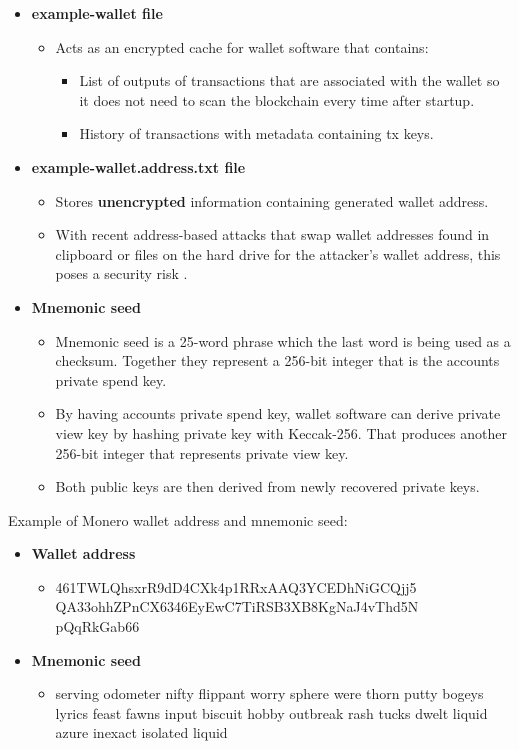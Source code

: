 \documentclass[
  printed, %
  table,   %
  nolof,     %
  nolot,     %
           oneside, color
]{fithesis3}
\renewcommand{\texttt}[1]{%
  \begingroup
  \ttfamily
  \begingroup\lccode`~=`/\lowercase{\endgroup\def~}{/\discretionary{}{}{}}%
  \begingroup\lccode`~=`[\lowercase{\endgroup\def~}{[\discretionary{}{}{}}%
  \begingroup\lccode`~=`.\lowercase{\endgroup\def~}{.\discretionary{}{}{}}%
  \catcode`/=\active\catcode`[=\active\catcode`.=\active
  \scantokens{#1\noexpand}%
  \endgroup
}
\begin{document}
\begin{itemize}
\item \textbf{example-wallet file}
\begin{itemize}\itemsep0em
\item Acts as an encrypted cache for wallet software that contains:
\begin{itemize}\itemsep0em
\item List of outputs of transactions that are associated with the wallet so it does not need to scan the blockchain every time after startup.
\item History of transactions with metadata containing tx keys.
\end{itemize}
\end{itemize}
\item \textbf{example-wallet.address.txt file}
\begin{itemize}\itemsep0em
\item Stores \textbf{unencrypted} information containing generated wallet address.
\item With recent address-based attacks that swap wallet addresses found in clipboard or files on the hard drive for the attacker's wallet address, this poses a security risk \cite{cryptoshuffler}.
\end{itemize}
\item \textbf{Mnemonic seed}
\begin{itemize}\itemsep0em
\item Mnemonic seed is a 25-word phrase which the last word is being used as a checksum. Together they represent a 256-bit integer that is the accounts private spend key.
\item By having accounts private spend key, wallet software can derive private view key by hashing private key with Keccak-256. That produces another 256-bit integer that represents private view key.
\item Both public keys are then derived from newly recovered private keys.
\end{itemize}
\end{itemize}
Example of Monero wallet address and mnemonic seed:
\begin{itemize}\itemsep0em
\item \textbf{Wallet address}
\begin{itemize}\itemsep0em
\item 461TWLQhsxrR9dD4CXk4p1RRxAAQ3YCEDhNiGCQjj5\\QA33ohhZPnCX6346EyEwC7TiRSB3XB8KgNaJ4vThd5N\\pQqRkGab66
\end{itemize}
\item \textbf{Mnemonic seed}
\begin{itemize}\itemsep0em
\item serving odometer nifty flippant worry sphere were thorn putty bogeys lyrics feast fawns input biscuit hobby outbreak rash tucks dwelt liquid azure inexact isolated liquid
\end{itemize}
\end{itemize}
\end{document}
